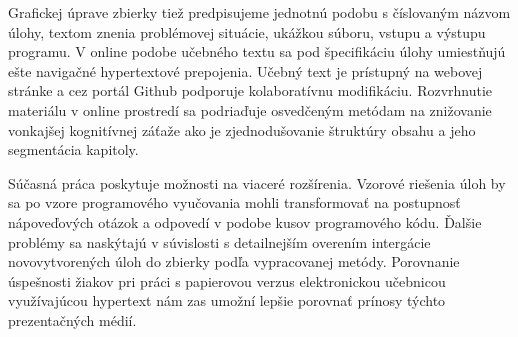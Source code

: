 Grafickej úprave zbierky tiež predpisujeme jednotnú podobu s číslovaným názvom úlohy, textom znenia problémovej situácie, ukážkou súboru, vstupu a výstupu programu. V online podobe učebného textu sa pod špecifikáciu úlohy umiestňujú ešte navigačné hypertextové prepojenia. Učebný text je prístupný na webovej stránke a cez portál Github podporuje kolaboratívnu modifikáciu. Rozvrhnutie materiálu v online prostredí sa podriaďuje osvedčeným metódam na znižovanie vonkajšej kognitívnej záťaže ako je zjednodušovanie štruktúry obsahu a jeho segmentácia kapitoly.

Súčasná práca poskytuje možnosti na viaceré rozšírenia. Vzorové riešenia úloh by sa po vzore programového vyučovania mohli transformovať na postupnosť nápoveďových otázok a odpovedí v podobe kusov programového kódu. Ďalšie problémy sa naskýtajú v súvislosti s detailnejším overením intergácie novovytvorených úloh do zbierky podľa vypracovanej metódy. Porovnanie úspešnosti žiakov pri práci s papierovou verzus elektronickou učebnicou využívajúcou hypertext nám zas umožní lepšie porovnať prínosy týchto prezentačných médií.